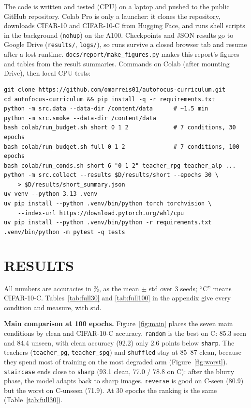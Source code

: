 \documentclass[a4paper,12pt]{report}
\newcommand{\cond}[1]{\texttt{#1}}
\begin{document}
The code is written and tested (CPU) on a laptop and pushed to the public GitHub repository. Colab Pro is only a launcher: it clones the repository, downloads CIFAR-10 and CIFAR-10-C from Hugging Face, and runs shell scripts in the background (\texttt{nohup}) on the A100. Checkpoints and JSON results go to Google Drive (\texttt{results/}, \texttt{logs/}), so runs survive a closed browser tab and resume after a lost runtime. \texttt{docs/report/make\_figures.py} makes this report's figures and tables from the result summaries. Commands on Colab (after mounting Drive), then local CPU tests:\par
{\footnotesize
\begin{verbatim}
git clone https://github.com/omarreis01/autofocus-curriculum.git
cd autofocus-curriculum && pip install -q -r requirements.txt
python -m src.data --data-dir /content/data      # ~1.5 min
python -m src.smoke --data-dir /content/data
bash colab/run_budget.sh short 0 1 2             # 7 conditions, 30 epochs
bash colab/run_budget.sh full 0 1 2              # 7 conditions, 100 epochs
bash colab/run_conds.sh short 6 "0 1 2" teacher_rpg teacher_alp ...
python -m src.collect --results $D/results/short --epochs 30 \
    > $D/results/short_summary.json
uv venv --python 3.13 .venv
uv pip install --python .venv/bin/python torch torchvision \
    --index-url https://download.pytorch.org/whl/cpu
uv pip install --python .venv/bin/python -r requirements.txt
.venv/bin/python -m pytest -q tests
\end{verbatim}
}

\chapter{RESULTS}

All numbers are accuracies in \%, as the mean $\pm$ std over 3 seeds; ``C'' means CIFAR-10-C. Tables~\ref{tab:full30} and \ref{tab:full100} in the appendix give every condition and measure, with std.

\textbf{Main comparison at 100 epochs.} Figure~\ref{fig:main} places the seven main conditions by clean and CIFAR-10-C accuracy. \cond{random} is the best on C: 85.3 seen and 84.4 unseen, with clean accuracy (92.2) only 2.6 points below \cond{sharp}. The teachers (\cond{teacher\_pg}, \cond{teacher\_spg}) and \cond{shuffled} stay at 85--87 clean, because they spend most of training on the most degraded arm (Figure~\ref{fig:worst}). \cond{staircase} ends close to \cond{sharp} (93.1 clean, 77.0 / 78.8 on C): after the blurry phase, the model adapts back to sharp images. \cond{reverse} is good on C-seen (80.9) but the worst on C-unseen (71.9). At 30 epochs the ranking is the same (Table~\ref{tab:full30}).
\end{document}
